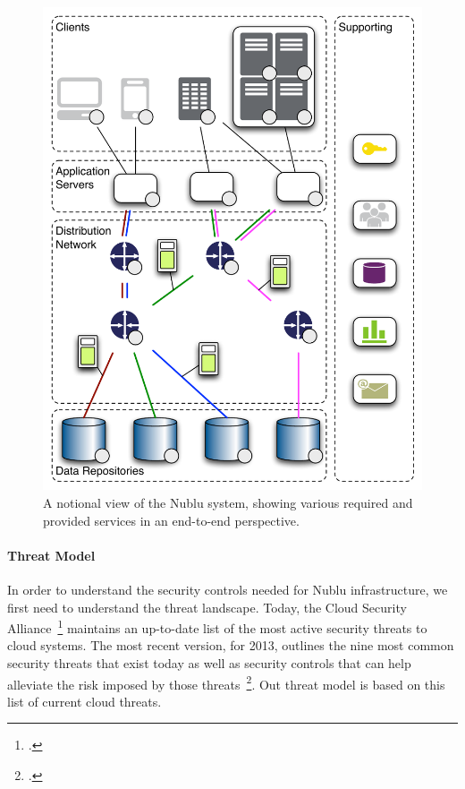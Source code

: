 \documentclass[10pt,letterpaper]{article}
\author{Christopher C. Lamb}
\begin{document}
\begin{figure}
\begin{center}
\includegraphics[width=.47\textwidth]{./images/network.pdf}
\end{center}
\caption{A notional view of the Nublu system, showing various required and provided services in an end-to-end perspective.}
\label{fig:network}
\end{figure}

\paragraph{Threat Model} In order to understand the security controls needed for Nublu infrastructure, we first need to understand the threat landscape.  Today, the Cloud Security Alliance~\footcite{csa} maintains an up-to-date list of the most active security threats to cloud systems.  The most recent version, for 2013, outlines the nine most common security threats that exist today as well as security controls that can help alleviate the risk imposed by those threats~\footcite{csa-noni:13}.  Out threat model is based on this list of current cloud threats.  

\end{document}
